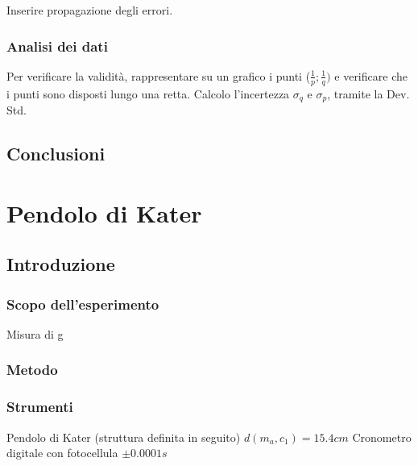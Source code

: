 \documentclass[a4paper,10pt]{report}
\begin{document}
Inserire propagazione degli errori. 
\subsection{Analisi dei dati}
Per verificare la validità, rappresentare su un grafico i punti ($\frac{1}{p};\frac{1}{q})$ e verificare che i punti sono disposti lungo una retta. 
Calcolo l'incertezza $\sigma_{q}$ e $\sigma_{p}$, tramite la Dev. Std. 



\section{Conclusioni}






\chapter{Pendolo di Kater}
\section{Introduzione}
\subsection{Scopo dell'esperimento}
Misura di g
\subsection{Metodo}
\subsection{Strumenti}
Pendolo di Kater (struttura definita in seguito)
$d(m_a,c_1)=15.4 cm$
Cronometro digitale con fotocellula $\pm 0.0001 s$ 
\end{document}
